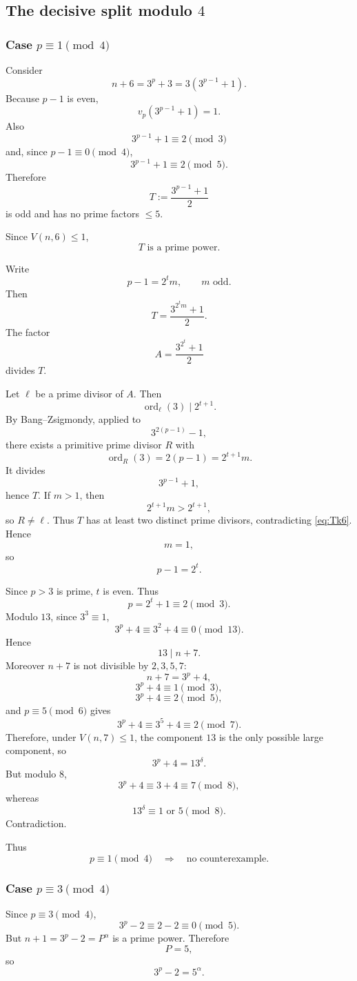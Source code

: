 \documentclass[11pt]{article}
\newcommand{\ord}{\operatorname{ord}}
\newcommand{\vp}{v_p}
\begin{document}
\subsection{The decisive split modulo \(4\)}

\subsubsection{Case \(p\equiv1\pmod4\)}

Consider
\[
n+6=3^p+3=3(3^{p-1}+1).
\]
Because \(p-1\) is even,
\[
\vp(3^{p-1}+1)=1.
\]
Also
\[
3^{p-1}+1\equiv2\pmod3
\]
and, since \(p-1\equiv0\pmod4\),
\[
3^{p-1}+1\equiv2\pmod5.
\]
Therefore
\[
T:=\frac{3^{p-1}+1}{2}
\]
is odd and has no prime factors \(\leq5\).

Since \(V(n,6)\leq1\),
\[
\boxed{T\text{ is a prime power}.}
\tag{21}\label{eq:Tk6}
\]

Write
\[
p-1=2^tm,
\qquad
m\text{ odd}.
\]
Then
\[
T=\frac{3^{2^tm}+1}{2}.
\]
The factor
\[
A=\frac{3^{2^t}+1}{2}
\]
divides \(T\).

Let \(\ell\) be a prime divisor of \(A\).  Then
\[
\ord_\ell(3)\mid 2^{t+1}.
\]
By Bang--Zsigmondy, applied to
\[
3^{2(p-1)}-1,
\]
there exists a primitive prime divisor \(R\) with
\[
\ord_R(3)=2(p-1)=2^{t+1}m.
\]
It divides
\[
3^{p-1}+1,
\]
hence \(T\).  If \(m>1\), then
\[
2^{t+1}m>2^{t+1},
\]
so \(R\neq\ell\).  Thus \(T\) has at least two distinct prime divisors,
contradicting \eqref{eq:Tk6}.  Hence
\[
m=1,
\]
so
\[
p-1=2^t.
\tag{22}
\]

Since \(p>3\) is prime, \(t\) is even.  Thus
\[
p=2^t+1\equiv2\pmod3.
\]
Modulo \(13\), since \(3^3\equiv1\),
\[
3^p+4\equiv3^2+4\equiv0\pmod{13}.
\]
Hence
\[
13\mid n+7.
\]
Moreover \(n+7\) is not divisible by \(2,3,5,7\):
\[
n+7=3^p+4,
\]
\[
3^p+4\equiv1\pmod3,
\]
\[
3^p+4\equiv2\pmod5,
\]
and \(p\equiv5\pmod6\) gives
\[
3^p+4\equiv3^5+4\equiv2\pmod7.
\]
Therefore, under \(V(n,7)\leq1\), the component \(13\) is the only possible
large component, so
\[
3^p+4=13^\delta.
\]
But modulo \(8\),
\[
3^p+4\equiv3+4\equiv7\pmod8,
\]
whereas
\[
13^\delta\equiv1\text{ or }5\pmod8.
\]
Contradiction.

Thus
\[
\boxed{
p\equiv1\pmod4
\quad\Longrightarrow\quad
\text{no counterexample}.
}
\tag{23}
\]

\subsubsection{Case \(p\equiv3\pmod4\)}

Since \(p\equiv3\pmod4\),
\[
3^p-2\equiv2-2\equiv0\pmod5.
\]
But \(n+1=3^p-2=P^\alpha\) is a prime power. Therefore
\[
P=5,
\]
so
\[
3^p-2=5^\alpha.
\tag{24}
\]
\end{document}
